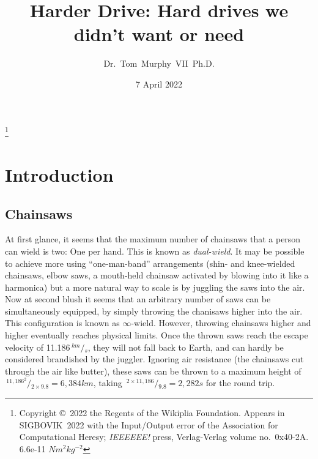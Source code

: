 \documentclass[twocolumn]{article}
\newcommand\sfrac[2]{\!{}\,^{#1}\!/{}\!_{#2}}
\begin{document}
\title{Harder Drive: Hard drives we didn't want or need}
\author{Dr.~Tom~Murphy~VII~Ph.D.}\thanks{
Copyright \copyright\ 2022 the Regents of the Wikiplia Foundation.
Appears in SIGBOVIK~2022 with the
Input/Output error of the Association for Computational Heresy; {\em IEEEEEE!}
press, Verlag-Verlag volume no.~0x40-2A. 6.6e-11 $N m^2kg^{-2}$
}

\renewcommand\th{\ensuremath{{}^{\textrm{th}}}}
\newcommand\st{\ensuremath{{}^{\textrm{st}}}}
\newcommand\rd{\ensuremath{{}^{\textrm{rd}}}}
\newcommand\nd{\ensuremath{{}^{\textrm{nd}}}}

\renewcommand\paragraph[1]{\smallskip \noindent{\bf #1}\enspace}

\date{7 April 2022}

\maketitle \thispagestyle{empty}

\sloppypar


\section{Introduction}


\subsection{Chainsaws}

At first glance, it seems that the maximum number of chainsaws that a
person can wield is two: One per hand. This is known as {\em
  dual-wield}. It may be possible to achieve more using
``one-man-band'' arrangements (shin- and knee-wielded chainsaws, elbow
saws, a mouth-held chainsaw activated by blowing into it like a
harmonica) but a more natural way to scale is by juggling the saws
into the air. Now at second blush it seems that an arbitrary number of
saws can be simultaneously equipped, by simply throwing the chanisaws
higher into the air. This configuration is known as $\infty$-wield.
However, throwing chainsaws higher and higher eventually reaches
physical limits. Once the thrown saws reach the escape velocity of
11.186$\sfrac{km}{s}$, they will not fall back to Earth, and can
hardly be considered brandished by the juggler. Ignoring air resistance
(the chainsaws cut through the air like butter), these saws can be
thrown to a maximum height of $\sfrac{11,186^{2}}{2 \times 9.8} = 6,384 km$,
taking $\sfrac{2 \times 11,186}{9.8} = 2,282 s$ for the round trip.
\end{document}
